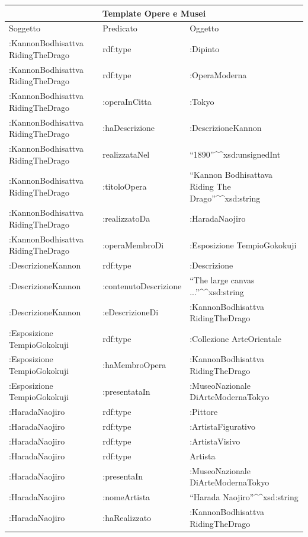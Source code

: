 \documentclass[12pt]{article}
\begin{document}
\begin{center}
 \begin{tabular}{ |p{3cm}|p{3cm}|p{3cm}| }
 \hline
 \multicolumn{3}{|c|}{Template Opere e Musei} \\
 \hline
 Soggetto & Predicato & Oggetto\\
 \hline
 :KannonBodhisattva RidingTheDrago & rdf:type & :Dipinto   \\
 :KannonBodhisattva RidingTheDrago &   rdf:type  & :OperaModerna\\
 :KannonBodhisattva RidingTheDrago & :operaInCitta & :Tokyo\\
 :KannonBodhisattva RidingTheDrago &:haDescrizione & :DescrizioneKannon\\
 :KannonBodhisattva RidingTheDrago & realizzataNel & “1890”\textasciicircum \textasciicircum xsd:unsignedInt\\
 :KannonBodhisattva RidingTheDrago & :titoloOpera  & “Kannon Bodhisattava Riding The Drago”\textasciicircum \textasciicircum xsd:string  \\
 :KannonBodhisattva RidingTheDrago & :realizzatoDa  & :HaradaNaojiro\\
 :KannonBodhisattva RidingTheDrago & :operaMembroDi  & :Esposizione TempioGokokuji   \\
 :DescrizioneKannon & rdf:type  & :Descrizione\\
 :DescrizioneKannon & :contenutoDescrizione  & “The large canvas ...”\textasciicircum \textasciicircum xsd:string   \\
 :DescrizioneKannon & :eDescrizioneDi  & :KannonBodhisattva RidingTheDrago\\
 :Esposizione TempioGokokuji & rdf:type  & :Collezione ArteOrientale\\
 :Esposizione TempioGokokuji & :haMembroOpera  & :KannonBodhisattva RidingTheDrago\\
 :Esposizione TempioGokokuji & :presentataIn  & :MuseoNazionale DiArteModernaTokyo   \\
 :HaradaNaojiro & rdf:type  & :Pittore\\
 :HaradaNaojiro & rdf:type  & :ArtistaFigurativo   \\
 :HaradaNaojiro & rdf:type  & :ArtistaVisivo\\
 :HaradaNaojiro & rdf:type  & Artista\\
 :HaradaNaojiro & :presentaIn  & :MuseoNazionale DiArteModernaTokyo\\
  :HaradaNaojiro & :nomeArtista  & “Harada Naojiro”\textasciicircum \textasciicircum xsd:string\\
 :HaradaNaojiro & :haRealizzato  & :KannonBodhisattva RidingTheDrago\\
 \hline
\end{tabular}
\end{center}
\newpage
\end{document}

